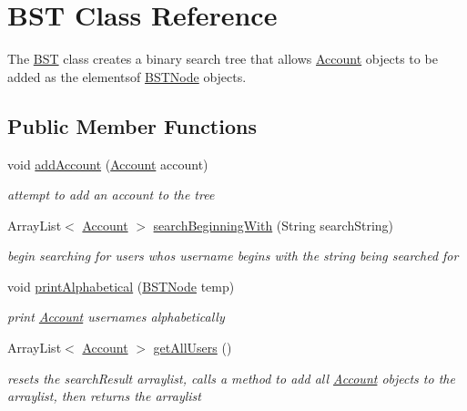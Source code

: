 \hypertarget{class_b_s_t}{}\section{B\+ST Class Reference}
\label{class_b_s_t}


The \hyperlink{class_b_s_t}{B\+ST} class creates a binary search tree that allows \hyperlink{class_account}{Account} objects to be added as the elementsof \hyperlink{class_b_s_t_node}{B\+S\+T\+Node} objects.  


\subsection*{Public Member Functions}
\begin{DoxyCompactItemize}
\item 
void \hyperlink{class_b_s_t_a618399aa893cac01fd09ee30329002da}{add\+Account} (\hyperlink{class_account}{Account} account)
\begin{DoxyCompactList}\small\item\em attempt to add an account to the tree \end{DoxyCompactList}\item 
Array\+List$<$ \hyperlink{class_account}{Account} $>$ \hyperlink{class_b_s_t_a6e9512f119e63d6179adeb1cbe53e668}{search\+Beginning\+With} (String search\+String)
\begin{DoxyCompactList}\small\item\em begin searching for users who\textquotesingle{}s username begins with the string being searched for \end{DoxyCompactList}\item 
void \hyperlink{class_b_s_t_a25a44d8679e06abada215f152dab7546}{print\+Alphabetical} (\hyperlink{class_b_s_t_node}{B\+S\+T\+Node} temp)
\begin{DoxyCompactList}\small\item\em print \hyperlink{class_account}{Account} usernames alphabetically \end{DoxyCompactList}\item 
Array\+List$<$ \hyperlink{class_account}{Account} $>$ \hyperlink{class_b_s_t_a8c2f9ab541fcf9566854b84ee5e9c97c}{get\+All\+Users} ()
\begin{DoxyCompactList}\small\item\em resets the search\+Result arraylist, calls a method to add all \hyperlink{class_account}{Account} objects to the arraylist, then returns the arraylist \end{DoxyCompactList}\item 

\end{DoxyCompactItemize}
